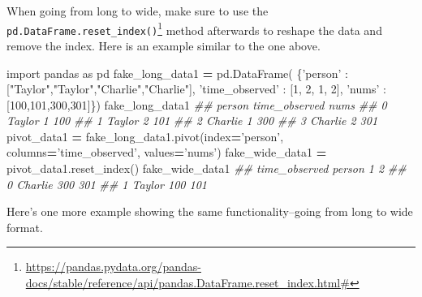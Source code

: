\documentclass[12pt,krantz2]{krantz}
\makeatletter
\newenvironment{Shaded}{\begin{snugshade}}{\end{snugshade}}
\newcommand{\CommentTok}[1]{\textcolor[rgb]{0.37,0.37,0.37}{\textit{#1}}}
\newcommand{\DecValTok}[1]{\textcolor[rgb]{0.06,0.06,0.06}{#1}}
\newcommand{\ImportTok}[1]{#1}
\newcommand{\NormalTok}[1]{#1}
\newcommand{\OperatorTok}[1]{\textcolor[rgb]{0.43,0.43,0.43}{\textbf{#1}}}
\newcommand{\StringTok}[1]{\textcolor[rgb]{0.5,0.5,0.5}{#1}}
\renewcommand{\href}[2]{#2\footnote{\url{#1}}}
\newenvironment{kframe}{%
\medskip{}
\setlength{\fboxsep}{.8em}
 \def\at@end@of@kframe{}%
 \ifinner\ifhmode%
  \def\at@end@of@kframe{\end{minipage}}%
  \begin{minipage}{\columnwidth}%
 \fi\fi%
 \def\FrameCommand##1{\hskip\@totalleftmargin \hskip-\fboxsep
 \colorbox{shadecolor}{##1}\hskip-\fboxsep
     \hskip-\linewidth \hskip-\@totalleftmargin \hskip\columnwidth}%
 \MakeFramed {\advance\hsize-\width
   \@totalleftmargin\z@ \linewidth\hsize
   \@setminipage}}%
 {\par\unskip\endMakeFramed%
 \at@end@of@kframe}
\renewenvironment{Shaded}{\begin{kframe}}{\end{kframe}}
\makeatother
\begin{document}
When going from long to wide, make sure to use the \href{https://pandas.pydata.org/pandas-docs/stable/reference/api/pandas.DataFrame.reset_index.html\#}{\texttt{pd.DataFrame.reset\_index()}} method afterwards to reshape the data and remove the index. Here is an example similar to the one above.

\begin{Shaded}
\begin{Highlighting}[]
\ImportTok{import}\NormalTok{ pandas }\ImportTok{as}\NormalTok{ pd}
\NormalTok{fake_long_data1 }\OperatorTok{=}\NormalTok{ pd.DataFrame(}
\NormalTok{  \{}\StringTok{'person'}\NormalTok{ : [}\StringTok{"Taylor"}\NormalTok{,}\StringTok{"Taylor"}\NormalTok{,}\StringTok{"Charlie"}\NormalTok{,}\StringTok{"Charlie"}\NormalTok{], }
  \StringTok{'time_observed'}\NormalTok{ : [}\DecValTok{1}\NormalTok{, }\DecValTok{2}\NormalTok{, }\DecValTok{1}\NormalTok{, }\DecValTok{2}\NormalTok{],}
  \StringTok{'nums'}\NormalTok{ : [}\DecValTok{100}\NormalTok{,}\DecValTok{101}\NormalTok{,}\DecValTok{300}\NormalTok{,}\DecValTok{301}\NormalTok{]\})}
\NormalTok{fake_long_data1}
\CommentTok{##     person  time_observed  nums}
\CommentTok{## 0   Taylor              1   100}
\CommentTok{## 1   Taylor              2   101}
\CommentTok{## 2  Charlie              1   300}
\CommentTok{## 3  Charlie              2   301}
\NormalTok{pivot_data1 }\OperatorTok{=}\NormalTok{ fake_long_data1.pivot(index}\OperatorTok{=}\StringTok{'person'}\NormalTok{, }
\NormalTok{                                    columns}\OperatorTok{=}\StringTok{'time_observed'}\NormalTok{, }
\NormalTok{                                    values}\OperatorTok{=}\StringTok{'nums'}\NormalTok{)}
\NormalTok{fake_wide_data1 }\OperatorTok{=}\NormalTok{ pivot_data1.reset_index()}
\NormalTok{fake_wide_data1}
\CommentTok{## time_observed   person    1    2}
\CommentTok{## 0              Charlie  300  301}
\CommentTok{## 1               Taylor  100  101}
\end{Highlighting}
\end{Shaded}

Here's one more example showing the same functionality--going from long to wide format.
\end{document}
